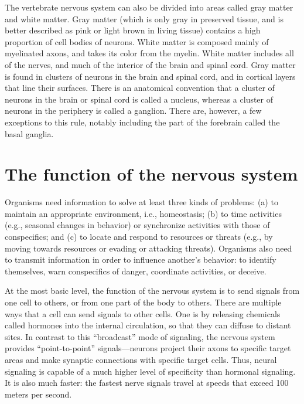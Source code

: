 The vertebrate nervous system can also be divided into areas called gray matter and white matter. Gray matter (which is only gray in preserved tissue, and is better described as pink or light brown in living tissue) contains a high proportion of cell bodies of neurons. White matter is composed mainly of myelinated axons, and takes its color from the myelin. White matter includes all of the nerves, and much of the interior of the brain and spinal cord. Gray matter is found in clusters of neurons in the brain and spinal cord, and in cortical layers that line their surfaces. There is an anatomical convention that a cluster of neurons in the brain or spinal cord is called a nucleus, whereas a cluster of neurons in the periphery is called a ganglion. There are, however, a few exceptions to this rule, notably including the part of the forebrain called the basal ganglia.

\hypertarget{the-function-of-the-nervous-system}{%
\section{The function of the nervous system}\label{the-function-of-the-nervous-system}}

Organisms need information to solve at least three kinds of problems: (a) to maintain an appropriate environment, i.e., homeostasis; (b) to time activities (e.g., seasonal changes in behavior) or synchronize activities with those of conspecifics; and (c) to locate and respond to resources or threats (e.g., by moving towards resources or evading or attacking threats). Organisms also need to transmit information in order to influence another's behavior: to identify themselves, warn conspecifics of danger, coordinate activities, or deceive.

At the most basic level, the function of the nervous system is to send signals from one cell to others, or from one part of the body to others. There are multiple ways that a cell can send signals to other cells. One is by releasing chemicals called hormones into the internal circulation, so that they can diffuse to distant sites. In contrast to this ``broadcast'' mode of signaling, the nervous system provides ``point-to-point'' signals---neurons project their axons to specific target areas and make synaptic connections with specific target cells. Thus, neural signaling is capable of a much higher level of specificity than hormonal signaling. It is also much faster: the fastest nerve signals travel at speeds that exceed 100 meters per second.

